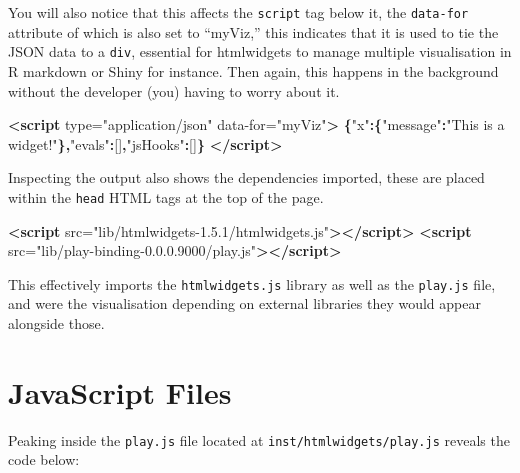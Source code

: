 \documentclass[
]{krantz}
\makeatletter
\newenvironment{Shaded}{\begin{snugshade}}{\end{snugshade}}
\newcommand{\KeywordTok}[1]{\textcolor[rgb]{0.27,0.27,0.27}{\textbf{#1}}}
\newcommand{\NormalTok}[1]{#1}
\newcommand{\OperatorTok}[1]{\textcolor[rgb]{0.43,0.43,0.43}{\textbf{#1}}}
\newcommand{\OtherTok}[1]{\textcolor[rgb]{0.37,0.37,0.37}{#1}}
\newcommand{\StringTok}[1]{\textcolor[rgb]{0.5,0.5,0.5}{#1}}
\newenvironment{kframe}{%
\medskip{}
\setlength{\fboxsep}{.8em}
 \def\at@end@of@kframe{}%
 \ifinner\ifhmode%
  \def\at@end@of@kframe{\end{minipage}}%
  \begin{minipage}{\columnwidth}%
 \fi\fi%
 \def\FrameCommand##1{\hskip\@totalleftmargin \hskip-\fboxsep
 \colorbox{shadecolor}{##1}\hskip-\fboxsep
     \hskip-\linewidth \hskip-\@totalleftmargin \hskip\columnwidth}%
 \MakeFramed {\advance\hsize-\width
   \@totalleftmargin\z@ \linewidth\hsize
   \@setminipage}}%
 {\par\unskip\endMakeFramed%
 \at@end@of@kframe}
\renewenvironment{Shaded}{\begin{kframe}}{\end{kframe}}
\makeatother
\begin{document}
You will also notice that this affects the \texttt{script} tag below it, the \texttt{data-for} attribute of which is also set to ``myViz,'' this indicates that it is used to tie the JSON data to a \texttt{div}, essential for htmlwidgets to manage multiple visualisation in R markdown or Shiny for instance. Then again, this happens in the background without the developer (you) having to worry about it.

\begin{Shaded}
\begin{Highlighting}[]
\KeywordTok{<script}\OtherTok{ type=}\StringTok{"application/json"} 
\OtherTok{  data{-}for=}\StringTok{"myViz"}\KeywordTok{>}
  \OperatorTok{\{}\StringTok{"x"}\OperatorTok{:\{}\StringTok{"message"}\OperatorTok{:}\StringTok{"This is a widget!"}\OperatorTok{\},}\StringTok{"evals"}\OperatorTok{:}\NormalTok{[]}\OperatorTok{,}\StringTok{"jsHooks"}\OperatorTok{:}\NormalTok{[]}\OperatorTok{\}}
\KeywordTok{</script>}
\end{Highlighting}
\end{Shaded}

Inspecting the output also shows the dependencies imported, these are placed within the \texttt{head} HTML tags at the top of the page.

\begin{Shaded}
\begin{Highlighting}[]
\KeywordTok{<script}\OtherTok{ src=}\StringTok{"lib/htmlwidgets{-}1.5.1/htmlwidgets.js"}\KeywordTok{></script>}
\KeywordTok{<script}\OtherTok{ src=}\StringTok{"lib/play{-}binding{-}0.0.0.9000/play.js"}\KeywordTok{></script>}
\end{Highlighting}
\end{Shaded}

This effectively imports the \texttt{htmlwidgets.js} library as well as the \texttt{play.js} file, and were the visualisation depending on external libraries they would appear alongside those.

\hypertarget{widgets-first-js-files}{%
\section{JavaScript Files}\label{widgets-first-js-files}}

Peaking inside the \texttt{play.js} file located at \texttt{inst/htmlwidgets/play.js} reveals the code below:
\end{document}
